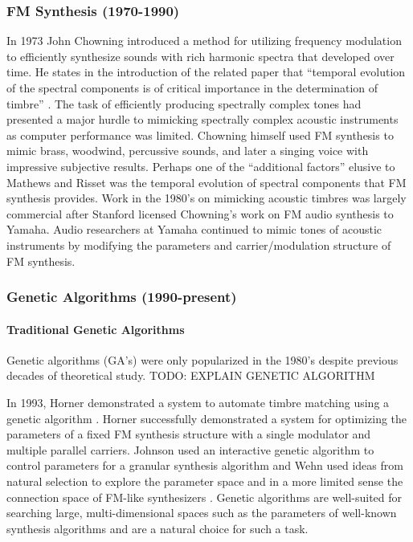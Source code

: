 \documentclass[12pt]{article}
\begin{document}
\subsubsection{FM Synthesis (1970-1990)}
In 1973 John Chowning introduced a method for utilizing frequency modulation to efficiently synthesize sounds with rich harmonic spectra that developed over time. He states in the introduction of the related paper that ``temporal evolution of the spectral components is of critical importance in the determination of timbre'' \citep{chowning1973synthesis}. The task of efficiently producing spectrally complex tones had presented a major hurdle to mimicking spectrally complex acoustic instruments as computer performance was limited. Chowning himself used FM synthesis to mimic brass, woodwind, percussive sounds, and later a singing voice \citep{chowning1989frequency} with impressive subjective results. Perhaps one of the ``additional factors'' elusive to Mathews and Risset was the temporal evolution of spectral components that FM synthesis provides.
Work in the 1980's on mimicking acoustic timbres was largely commercial after Stanford licensed Chowning's work on FM audio synthesis to Yamaha. Audio researchers at Yamaha continued to mimic tones of acoustic instruments by modifying the parameters and carrier/modulation structure of FM synthesis.

\subsubsection{Genetic Algorithms (1990-present)}
\paragraph{Traditional Genetic Algorithms}
Genetic algorithms (GA's) were only popularized in the 1980's despite previous decades of theoretical study. TODO: EXPLAIN GENETIC ALGORITHM

In 1993, Horner demonstrated a system to automate timbre matching using a genetic algorithm \citep{horner1993machine}. Horner successfully demonstrated a system for optimizing the parameters of a fixed FM synthesis structure with a single modulator and multiple parallel carriers. Johnson used an interactive genetic algorithm to control parameters for a granular synthesis algorithm \citep{johnson1999exploring} and Wehn used ideas from natural selection to explore the parameter space and in a more limited sense the connection space of FM-like synthesizers \citep{wehn1998using}. Genetic algorithms are well-suited for searching large, multi-dimensional spaces such as the parameters of well-known synthesis algorithms and are a natural choice for such a task.
\end{document}
